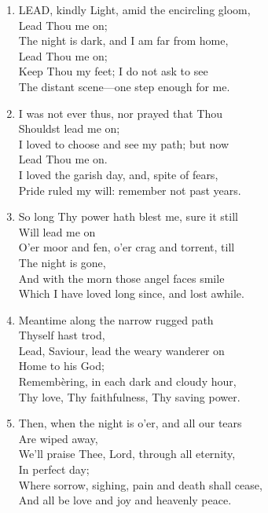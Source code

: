 \begin{enumerate}
    \item LEAD, kindly Light, amid the encircling gloom, \\
        Lead Thou me on; \\
        The night is dark, and I am far from home, \\
        Lead Thou me on; \\
        Keep Thou my feet; I do not ask to see \\
        The distant scene---one step enough for me.

    \item I was not ever thus, nor prayed that Thou \\
        Shouldst lead me on; \\
        I loved to choose and see my path; but now \\
        Lead Thou me on. \\
        I loved the garish day, and, spite of fears, \\
        Pride ruled my will: remember not past years.

    \item So long Thy power hath blest me, sure it still \\
        Will lead me on \\
        O'er moor and fen, o'er crag and torrent, till \\
        The night is gone, \\
        And with the morn those angel faces smile \\
        Which I have loved long since, and lost awhile.

    \item Meantime along the narrow rugged path \\
        Thyself hast trod, \\
        Lead, Saviour, lead the weary wanderer on \\
        Home to his God; \\
        Rememb\`ering, in each dark and cloudy hour, \\
        Thy love, Thy faithfulness, Thy saving power.

    \item Then, when the night is o'er, and all our tears \\
        Are wiped away, \\
        We'll praise Thee, Lord, through all eternity, \\
        In perfect day; \\
        Where sorrow, sighing, pain and death shall cease, \\
        And all be love and joy and heavenly peace.

\end{enumerate}

